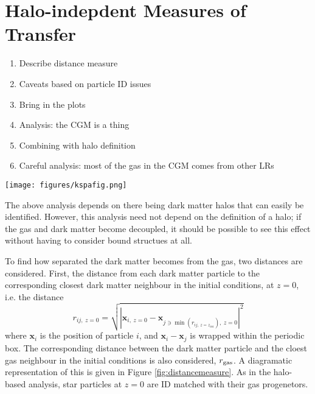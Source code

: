 \section{Halo-indepdent Measures of Transfer}

\begin{enumerate}
    \item Describe distance measure
    \item Caveats based on particle ID issues
    \item Bring in the plots
    \item Analysis: the CGM is a thing
    \item Combining with halo definition
    \item Careful analysis: most of the gas in the CGM comes from other LRs
\end{enumerate}

\begin{figure*}
    \centering
    \texttt{[image: figures/kspafig.png]}
    \caption{A diagramatic representation of the distance measure. On the left, the initial conditions are shown. The blue dark matter particles each find their closest dark matter and gas (red) neighbour. These particles are then tracked to the final state of the simulation (right) and the distances between them calculated again.}
    \label{fig:distancemeasure}
\end{figure*}

The above analysis depends on there being dark matter halos that can easily be identified. However, this analysis need not depend on the definition of a halo; if the gas and dark matter become decoupled, it should be possible to see this effect without having to consider bound structues at all.

To find how separated the dark matter becomes from the gas, two distances are considered. First, the distance from each dark matter particle to the corresponding closest dark matter neighbour in the initial conditions, at $z=0$, i.e. the distance
\begin{equation}
    r_{ij, ~z=0} = \sqrt{
        \left|
            \mathbf{x}_{i, ~z=0} - \mathbf{x}_{j \ni \min(r_{ij, ~z=z_{ini}}), ~z=0}
        \right|^2
    }
    \label{eqn:minimal}
\end{equation}
where $\mathbf{x}_i$ is the position of particle $i$, and $\mathbf{x}_i - \mathbf{x}_j$ is wrapped within the periodic box. The corresponding distance between the dark matter particle and the cloest gas neighbour in the initial conditions is also considered, $r_{\rm gas}$. A diagramatic representation of this is given in Figure \ref{fig:distancemeasure}. As in the halo-based analysis, star particles at $z=0$ are ID matched with their gas progenetors.

